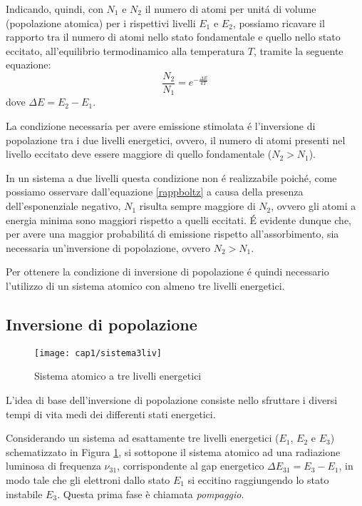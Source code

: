  Indicando, quindi, con $N_1$ e $N_2$ il numero di atomi per unit\'a di volume (popolazione atomica) per i rispettivi livelli $E_1$ e $E_2$, possiamo ricavare il rapporto tra il numero di atomi nello stato fondamentale e quello nello stato eccitato, all'equilibrio termodinamico alla temperatura $T$, tramite la seguente equazione:
\begin{equation}
	\frac{N_2}{N_1}=e^{-\frac{\Delta E}{kT}} 
	\label{rappboltz}
\end{equation}
dove $\Delta E = E_2 - E_1$.

La condizione necessaria per avere emissione stimolata \'e l'inversione di popolazione tra i due livelli energetici, ovvero, il numero di atomi presenti nel livello eccitato deve essere maggiore di quello fondamentale ($N_2 > N_1$).

In un sistema a due livelli questa condizione non \'e realizzabile poich\'e, come possiamo osservare dall'equazione \ref{rappboltz} a causa della presenza dell'esponenziale negativo, $N_1$ risulta sempre maggiore di $N_2$, ovvero gli atomi a energia minima sono maggiori rispetto a quelli eccitati. 
\'E evidente dunque che, per avere una maggior probabilit\'a di emissione rispetto all'assorbimento, sia necessaria un'inversione di popolazione, ovvero $N_2 > N_1$.

Per ottenere la condizione di inversione di popolazione \'e quindi necessario l'utilizzo di un sistema atomico con almeno tre livelli energetici.

\subsection{Inversione di popolazione}
\begin{figure}[H]
  \begin{center}
    \texttt{[image: cap1/sistema3liv]}
    \caption{Sistema atomico a tre livelli energetici}
    \label{sistema3liv}
  \end{center}
\end{figure}
L'idea di base dell'inversione di popolazione consiste nello sfruttare i diversi tempi di vita medi dei differenti stati energetici.

Considerando un sistema ad esattamente tre livelli energetici ($E_1$, $E_2$ e $E_3$) schematizzato in Figura \ref{sistema3liv}, si sottopone il sistema atomico ad una radiazione luminosa di frequenza $\nu_{31}$, corrispondente al gap energetico $\Delta E_{31} = E_3-E_1$, in modo tale che gli elettroni dallo stato $E_1$ si eccitino raggiungendo lo stato instabile $E_3$. Questa prima fase è chiamata \emph{pompaggio}.

